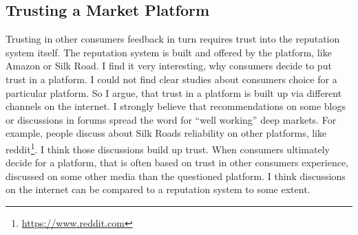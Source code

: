 \subsection{Trusting a Market Platform}

Trusting in other consumers feedback in turn requires trust into the reputation system itself. The reputation system is built and offered by the platform, like Amazon or Silk Road. I find it very interesting, why consumers decide to put trust in a platform. I could not find clear studies about consumers choice for a particular platform. So I argue, that trust in a platform is built up via different channels on the internet. I strongly believe that recommendations on some blogs or discussions in forums spread the word for ``well working'' deep markets. For example, people discuss about Silk Roads reliability on other platforms, like reddit\footnote{\url{https://www.reddit.com}}. I think those discussions build up trust. When consumers ultimately decide for a platform, that is often based on trust in other consumers experience, discussed on some other media than the questioned platform. I think discussions on the internet can be compared to a reputation system to some extent.